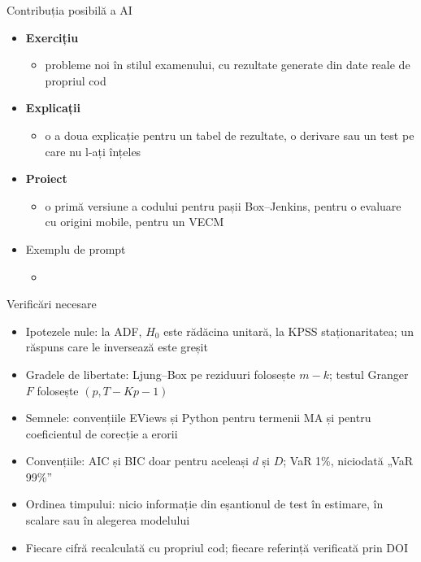 \begin{frame}{Contribuția posibilă a AI}
\itemsize{\small}
\begin{itemize}
    \item \textbf{Exercițiu}
    \begin{itemize}
        \item probleme noi în stilul examenului, cu rezultate generate din date reale de propriul cod
    \end{itemize}
    \item \textbf{Explicații}
    \begin{itemize}
        \item o a doua explicație pentru un tabel de rezultate, o derivare sau un test pe care nu l-ați înțeles
    \end{itemize}
    \item \textbf{Proiect}
    \begin{itemize}
        \item o primă versiune a codului pentru pașii Box--Jenkins, pentru o evaluare cu origini mobile, pentru un VECM
    \end{itemize}
    \item Exemplu de prompt
    \begin{itemize}
        \item {}
    \end{itemize}
\end{itemize}
\end{frame}

\begin{frame}{Verificări necesare}
\itemsize{\small}
\begin{itemize}
    \item Ipotezele nule: la ADF, $H_0$ este rădăcina unitară, la KPSS staționaritatea; un răspuns care le inversează este greșit
    \item Gradele de libertate: Ljung--Box pe reziduuri folosește $m - k$; testul Granger $F$ folosește $(p, T - Kp - 1)$
    \item Semnele: convențiile EViews și Python pentru termenii MA și pentru coeficientul de corecție a erorii
    \item Convențiile: AIC și BIC doar pentru aceleași $d$ și $D$; VaR 1\%, niciodată „VaR 99\%”
    \item Ordinea timpului: nicio informație din eșantionul de test în estimare, în scalare sau în alegerea modelului
    \item Fiecare cifră recalculată cu propriul cod; fiecare referință verificată prin DOI
\end{itemize}
\end{frame}


